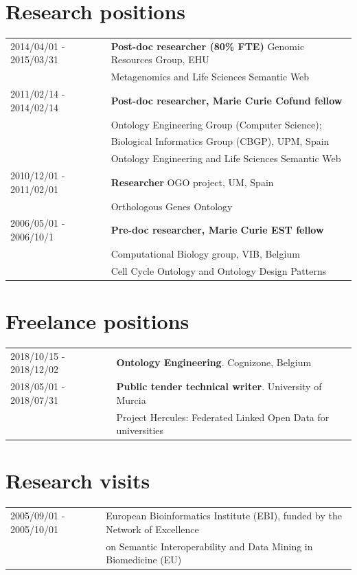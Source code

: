 \documentclass[11pt,fullpage]{article}
\begin{document}
\section*{Research positions}
\begin{tabular}{ll}
2014/04/01 - 2015/03/31 & {\bf Post-doc researcher (80\% FTE)} Genomic Resources Group, EHU  \\
   & Metagenomics and Life Sciences Semantic Web \\
2011/02/14 - 2014/02/14 & {\bf Post-doc researcher, Marie Curie Cofund fellow} \\
     & Ontology Engineering Group (Computer Science); \\
     & Biological Informatics Group (CBGP), UPM, Spain \\
     & Ontology Engineering and Life Sciences Semantic Web \\
2010/12/01 - 2011/02/01 & {\bf Researcher} OGO project, UM, Spain \\
     & Orthologous Genes Ontology \\
2006/05/01 - 2006/10/1 & {\bf Pre-doc researcher, Marie Curie EST fellow} \\
    & Computational Biology group, VIB, Belgium \\
    & Cell Cycle Ontology and Ontology Design Patterns \\
\end{tabular}

\section*{Freelance positions}
\begin{tabular}{ll}
2018/10/15 - 2018/12/02 & {\bf Ontology Engineering}. Cognizone, Belgium\\
2018/05/01 - 2018/07/31 & {\bf Public tender technical writer}. University of Murcia \\
        &  Project Hercules: Federated Linked Open Data for universities\\
\end{tabular}

\section*{Research visits}

\begin{tabular}{ll}
 2005/09/01 - 2005/10/01 & European Bioinformatics Institute (EBI), funded by the Network of Excellence \\
      & on Semantic Interoperability and Data Mining in Biomedicine (EU)

\end{tabular}
\end{document}

